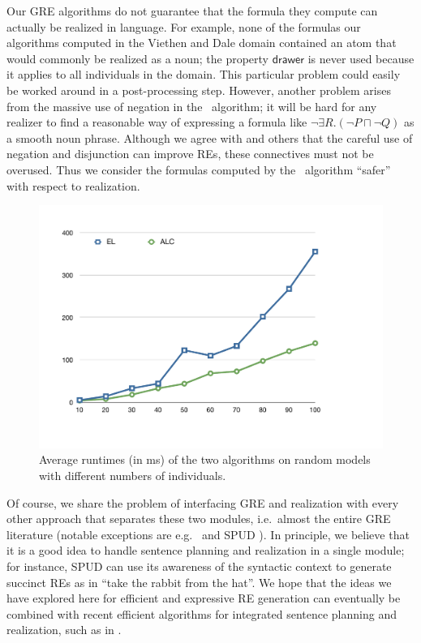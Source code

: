 Our GRE algorithms do not guarantee that the formula they compute can
actually be realized in language.  For example, none of the formulas
our algorithms computed in the Viethen and Dale domain contained an
atom that would commonly be realized as a noun; the property
$\mathsf{drawer}$ is never used because it applies to all individuals
in the domain.  This particular problem could easily be worked around
in a post-processing step.  However, another problem arises from the
massive use of negation in the \alc\ algorithm; it will be hard for
any realizer to find a reasonable way of expressing a formula like
$\neg \exists R.(\neg P \sqcap \neg Q)$ as a smooth noun phrase.
Although we agree with  and
others that the careful use of negation and disjunction can improve
REs, these connectives must not be overused.  Thus we consider the
formulas computed by the \el\ algorithm ``safer'' with respect to
realization.


\begin{figure}[t]
  \centering
  \includegraphics[width=\columnwidth]{runtimes}
  \caption{Average runtimes (in ms) of the two algorithms on random
    models with different numbers of individuals.}%
  \label{fig:runtimes}
\end{figure}

Of course, we share the problem of interfacing GRE and realization
with every other approach that separates these two modules, i.e.\
almost the entire GRE literature (notable exceptions are e.g.\
 and SPUD \cite{Stone1998a}).  In principle, we
believe that it is a good idea to handle sentence planning and
realization in a single module; for instance, SPUD can use its
awareness of the syntactic context to generate succinct REs as in
``take the rabbit from the hat''.  We hope that the ideas we have
explored here for efficient and expressive RE generation can
eventually be combined with recent efficient algorithms for integrated
sentence planning and realization, such as in .

